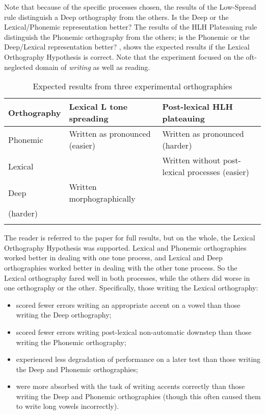 \documentclass[output=paper]{langscibook}
\begin{document}
Note that because of the specific processes chosen, the results of the Low-Spread rule distinguish a Deep orthography from the others. Is the Deep or the Lexical/Phonemic representation better? The results of the HLH Plateauing rule distinguish the Phonemic orthography from the others; is the Phonemic or the Deep/Lexical representation better? , shows the expected results if the Lexical Orthography Hypothesis is correct. Note that the experiment focused on the oft-neglected domain of \textit{writing} as well as reading.

\begin{table}
    \begin{tabularx}{\textwidth}{llQ}
    \lsptoprule

    Orthography & Lexical L tone spreading & Post-lexical HLH plateauing\\\midrule
    Phonemic & {Written as pronounced}     (easier) & {Written as pronounced}    (harder)\\\tablevspace
    {Lexical} &  & {Written without post-lexical processes} (easier)\\\tablevspace
    {Deep}  & Written morphographically \\  (harder) & \\
    \lspbottomrule
    \end{tabularx}
    \caption{Expected results from three experimental orthographies}
    \label{tab:cahill:21}
\end{table}

The reader is referred to the paper for full results, but on the whole, the Lexical Orthography Hypothesis was supported. Lexical and Phonemic orthographies worked better in dealing with one tone process, and Lexical and Deep orthographies worked better in dealing with the other tone process. So the Lexical orthography fared well in both processes, while the others did worse in one orthography or the other. Specifically, those writing the Lexical orthography:

\begin{itemize}
    \item scored fewer errors writing an appropriate accent on a vowel than those writing the Deep orthography;
    \item scored fewer errors writing post-lexical non-automatic downstep than those writing the Phonemic orthography;
    \item experienced less degradation of performance on a later test than those writing the Deep and Phonemic orthographies;
    \item were more absorbed with the task of writing accents correctly than those writing the Deep and Phonemic orthographies (though this often caused them to write long vowels incorrectly).
\end{itemize}
\end{document}
